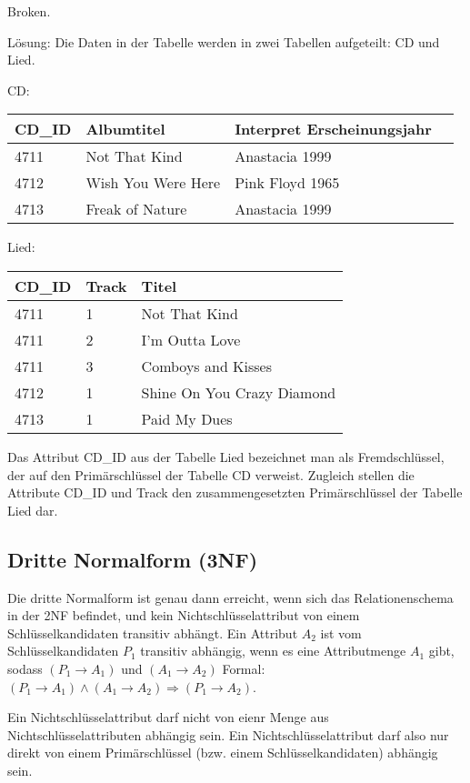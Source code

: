 \documentclass{scrbook}
\begin{document}
Broken.


Lösung:
Die Daten in der Tabelle werden in zwei Tabellen aufgeteilt: CD und Lied.

CD:\\
\begin{tabular}{| l | l | l | l |}
\hline
CD\_ID	& Albumtitel			& Interpret		Erscheinungsjahr \\
\hline
4711	& Not That Kind			& Anastacia		1999 \\
4712	& Wish You Were Here	& Pink Floyd	1965 \\
4713	& Freak of Nature		& Anastacia		1999 \\
\hline
\end{tabular}

Lied:\\
\begin{tabular}{| l | l | l |}
\hline
CD\_ID	& Track		& Titel \\
\hline
4711	& 1			& Not That Kind \\
4711	& 2			& I'm Outta Love \\
4711	& 3			& Comboys and Kisses \\
4712	& 1			& Shine On You Crazy Diamond \\
4713	& 1			& Paid My Dues \\
\hline
\end{tabular}

Das Attribut CD\_ID aus der Tabelle Lied bezeichnet man als Fremdschlüssel,
der auf den Primärschlüssel der Tabelle CD verweist.
Zugleich stellen die Attribute CD\_ID und Track den zusammengesetzten Primärschlüssel
der Tabelle Lied dar.




\subsection{Dritte Normalform (3NF)}

Die dritte Normalform ist genau dann erreicht, wenn sich das Relationenschema
in der 2NF befindet, und 
kein Nichtschlüsselattribut von einem Schlüsselkandidaten transitiv abhängt.
Ein Attribut $A_2$ ist vom Schlüsselkandidaten $P_1$ transitiv abhängig,
wenn es eine Attributmenge $A_1$ gibt, sodass $(P_1 → A_1)$ und $(A_1 → A_2)$
Formal: $(P_1 → A_1) ∧ (A_1 → A_2) ⇒ (P_1 → A_2)$.

Ein Nichtschlüsselattribut darf nicht von eienr Menge aus Nichtschlüsselattributen 
abhängig sein.
Ein Nichtschlüsselattribut darf also nur direkt von einem Primärschlüssel 
(bzw. einem Schlüsselkandidaten) abhängig sein.
\end{document}
